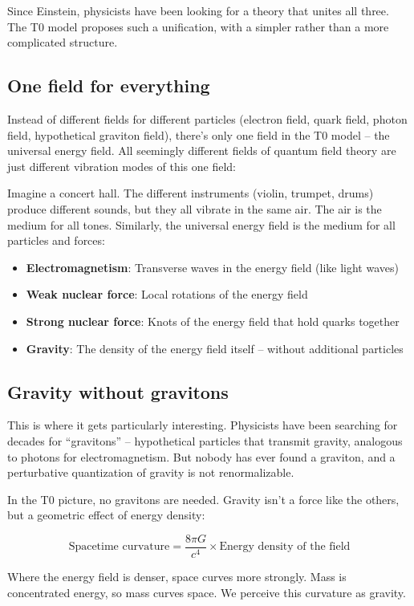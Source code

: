 	Since Einstein, physicists have been looking for a theory that unites all three. The T0 model proposes such a unification, with a simpler rather than a more complicated structure.
	
	\subsection{One field for everything}
	
	Instead of different fields for different particles (electron field, quark field, photon field, hypothetical graviton field), there's only one field in the T0 model -- the universal energy field. All seemingly different fields of quantum field theory are just different vibration modes of this one field:
	
	\begin{important}
		Imagine a concert hall. The different instruments (violin, trumpet, drums) produce different sounds, but they all vibrate in the same air. The air is the medium for all tones. Similarly, the universal energy field is the medium for all particles and forces:
		\begin{itemize}
			\item \textbf{Electromagnetism}: Transverse waves in the energy field (like light waves)
			\item \textbf{Weak nuclear force}: Local rotations of the energy field
			\item \textbf{Strong nuclear force}: Knots of the energy field that hold quarks together
			\item \textbf{Gravity}: The density of the energy field itself -- without additional particles
		\end{itemize}
	\end{important}
	
	\subsection{Gravity without gravitons}
	
	This is where it gets particularly interesting. Physicists have been searching for decades for ``gravitons'' -- hypothetical particles that transmit gravity, analogous to photons for electromagnetism. But nobody has ever found a graviton, and a perturbative quantization of gravity is not renormalizable.
	
	\begin{revolutionary}
		In the T0 picture, no gravitons are needed. Gravity isn't a force like the others, but a geometric effect of energy density:
		
		\begin{equation}
			\text{Spacetime curvature} = \frac{8\pi G}{c^4} \times \text{Energy density of the field}
		\end{equation}
		
		Where the energy field is denser, space curves more strongly. Mass is concentrated energy, so mass curves space. We perceive this curvature as gravity.
	\end{revolutionary}
	
